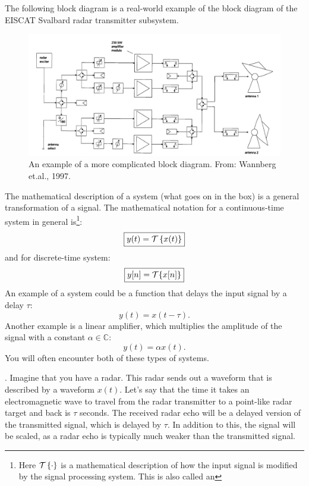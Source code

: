 The following block diagram is a real-world example of the block diagram of the 
EISCAT Svalbard radar transmitter subsystem.
\begin{figure}
   \begin{center}
      \includegraphics[width=\textwidth]{ch04/figures/wannberg97.jpg}
   \end{center}
   \caption{An example of a more complicated block diagram. From: Wannberg et.al., 1997.}
   \label{fig:esr}
\end{figure}

The mathematical description of a system (what goes on in the box) is a 
general transformation of a signal. The mathematical notation for a 
continuous-time system in general is\footnote{Here $\spop$ is a mathematical 
description of how the input signal is modified by the signal processing system. 
This is also called an
   }:
\begin{equation}
   \boxed{
      y(t) = \spop[x(t)]
   }
\end{equation}
and for discrete-time system:
\begin{equation}
   \boxed{
      y[n] = \spopb\{x[n]\}
   }
\end{equation}
An example of a system could be a function that delays the input
signal by a delay $\tau$:
\begin{equation}
   y(t) = x(t-\tau).
\end{equation}
Another example is a linear amplifier, which multiplies the amplitude
of the signal with a constant $\alpha \in \mathbb{C}$:
\begin{equation}
   y(t) = \alpha x(t).
\end{equation}
You will often encounter both of these types of systems.

. 
Imagine that you have a radar. This radar sends out a waveform that is described by a waveform $x(t)$. 
Let's say that the time it takes an electromagnetic wave to travel from the radar transmitter 
to a point-like radar target and back is $\tau$ seconds. The received radar echo will 
be a delayed version of the transmitted signal, which is delayed by $\tau$. 
In addition to this, the signal will be scaled, as a radar echo is typically much weaker than the transmitted signal.

